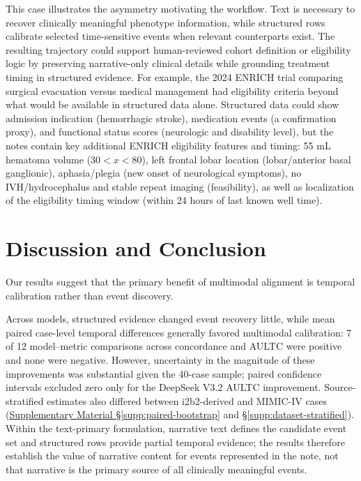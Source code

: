 \documentclass{ws-procs11x85}
\newif\ifshowrebuttalcolor
\newcommand{\rebuttal}[1]{%
  \ifshowrebuttalcolor
    \textcolor{rebuttalblue}{#1}%
  \else
    #1%
  \fi
}
\begin{document}

\textbf{}This case illustrates the asymmetry motivating the workflow. Text is necessary to recover clinically meaningful phenotype information, while structured rows calibrate selected time-sensitive events when relevant counterparts exist. The resulting trajectory could support human-reviewed cohort definition or eligibility logic by preserving narrative-only clinical details while grounding treatment timing in structured evidence. 
For example, the 2024 ENRICH trial comparing surgical evacuation versus medical management had eligibility criteria beyond what would be available in structured data alone\cite{pradilla2024trial}. 
Structured data could show admission indication (hemorrhagic stroke), medication events (a confirmation proxy), and functional status scores (neurologic and disability level), but the notes contain key additional ENRICH eligibility features and timing: 55 mL hematoma volume ($30<x<80$), left frontal lobar location (lobar/anterior basal ganglionic), aphasia/plegia (new onset of neurological symptoms), no IVH/hydrocephalus and stable repeat imaging (feasibility), as well as localization of the eligibility timing window (within 24 hours of last known well time).

\vspace{-0.75em}
\section{Discussion and Conclusion}
\label{sec:discussion}
\vspace{-0.5em}

Our results suggest that the primary benefit of multimodal alignment is temporal calibration rather than event discovery.
\rebuttal{
Across models, structured evidence changed event recovery little, while mean paired case-level temporal differences generally favored multimodal calibration: 7 of 12 model--metric comparisons across concordance and AULTC were positive and none were negative. However, uncertainty in the magnitude of these improvements was substantial given the 40-case sample; paired confidence intervals excluded zero only for the DeepSeek V3.2 AULTC improvement. Source-stratified estimates also differed between i2b2-derived and MIMIC-IV cases (\hyperref[supp:paired-bootstrap]{Supplementary Material \S\ref*{supp:paired-bootstrap}} and \hyperref[supp:dataset-stratified]{\S\ref*{supp:dataset-stratified}}).
Within the text-primary formulation, narrative text defines the candidate event set and structured rows provide partial temporal evidence; the results therefore establish the value of narrative content for events represented in the note, not that narrative is the primary source of all clinically meaningful events.}
\end{document}
